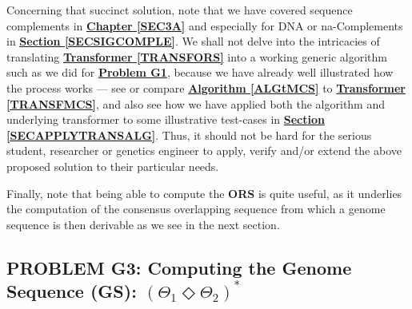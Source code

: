 \documentclass[a4paper, 18pt]{book} %
\begin{document}
Concerning that succinct solution, note that we have covered sequence complements in \textbf{\hyperref[SEC3A]{Chapter \ref{SEC3A}}} and especially for DNA or na-Complements in \textbf{\hyperref[SECSIGCOMPLE]{Section \ref{SECSIGCOMPLE}}}. We shall not delve into the intricacies of translating \textbf{\hyperref[TRANSFORS]{Transformer \ref{TRANSFORS}}} into a working generic algorithm such as we did for \textbf{\hyperref[PROBG1]{Problem G1}}, because we have already well illustrated how the process works --- see or compare  \textbf{\hyperref[ALGtMCS]{Algorithm \ref{ALGtMCS}}} to \textbf{\hyperref[TRANSFMCS]{Transformer \ref{TRANSFMCS}}}, and also see how we have applied both the algorithm and underlying transformer to some illustrative test-cases in \textbf{\hyperref[SECAPPLYTRANSALG]{Section \ref{SECAPPLYTRANSALG}}}. Thus, it should not be hard for the serious student, researcher or genetics engineer to apply, verify and/or extend the above proposed solution to their particular needs.

Finally, note that being able to compute the \textbf{ORS} is quite useful, as it underlies the computation of the consensus overlapping sequence from which a genome sequence is then derivable as we see in the next section.



\subsection{PROBLEM G3: Computing the Genome Sequence (GS): $(\Theta_1 \Diamond \Theta_2)^*$}
\label{SECCOMPGENSEQ}
\end{document}

